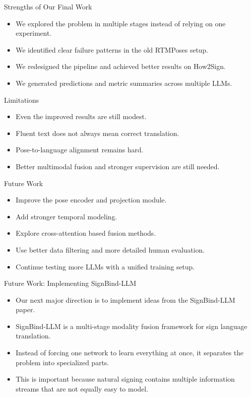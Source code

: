 \documentclass[aspectratio=169]{beamer}
\begin{document}
\begin{frame}{Strengths of Our Final Work}
\begin{itemize}
  \item We explored the problem in multiple stages instead of relying on one experiment.
  \item We identified clear failure patterns in the old RTMPoses setup.
  \item We redesigned the pipeline and achieved better results on How2Sign.
  \item We generated predictions and metric summaries across multiple LLMs.
\end{itemize}
\end{frame}

\begin{frame}{Limitations}
\begin{itemize}
  \item Even the improved results are still modest.
  \item Fluent text does not always mean correct translation.
  \item Pose-to-language alignment remains hard.
  \item Better multimodal fusion and stronger supervision are still needed.
\end{itemize}
\end{frame}

\begin{frame}{Future Work}
\begin{itemize}
  \item Improve the pose encoder and projection module.
  \item Add stronger temporal modeling.
  \item Explore cross-attention based fusion methods.
  \item Use better data filtering and more detailed human evaluation.
  \item Continue testing more LLMs with a unified training setup.
\end{itemize}
\end{frame}

\begin{frame}{Future Work: Implementing SignBind-LLM}
\begin{itemize}
  \item Our next major direction is to implement ideas from the SignBind-LLM paper.
  \item SignBind-LLM is a multi-stage modality fusion framework for sign language translation.
  \item Instead of forcing one network to learn everything at once, it separates the problem into specialized parts.
  \item This is important because natural signing contains multiple information streams that are not equally easy to model.
\end{itemize}
\end{frame}
\end{document}

